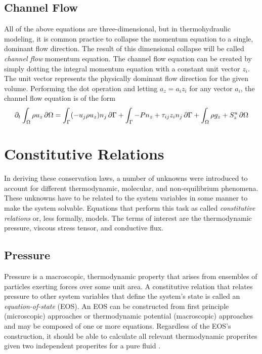 \documentclass[12pt]{../UWMadThesis}
\begin{document}
\subsection{Channel Flow}
All of the above equations are three-dimensional, but in thermohydraulic modeling, it is common practice to collapse the momentum equation to a single, dominant flow direction.
The result of this dimensional collapse will be called \textit{channel flow} momentum equation.
The channel flow equation can be created by simply dotting the integral momentum equation with a constant unit vector $z_i$.
The unit vector represents the physically dominant flow direction for the given volume.
Performing the dot operation and letting $a_z = a_i z_i$ for any vector $a_i$, the channel flow equation is of the form
\begin{equation}
    \partial_t\:\! \int_{\Omega} \rho u_z \,\partial\Omega = \int_{\Gamma} (-u_j \rho u_z) n_j \,\partial\Gamma + \int_{\Gamma} - P n_z + \tau_{ij} z_i n_j \,\partial\Gamma + \int_{\Omega} \rho g_z + S^u_z \,\partial\Omega
\end{equation}








\section{Constitutive Relations}\label{Section:ConstitutiveRelations}
In deriving these conservation laws, a number of unknowns were introduced to account for different thermodynamic, molecular, and non-equilibrium phenomena.
These unknowns have to be related to the system variables in some manner to make the system solvable.
Equations that perform this task as called \textit{constitutive relations} or, less formally, models.
The terms of interest are the thermodynamic pressure, viscous stress tensor, and conductive flux.

\subsection{Pressure}
Pressure is a macroscopic, thermodynamic property that arises from ensembles of particles exerting forces over some unit area.
A constitutive relation that relates pressure to other system variables that define the system's state is called an \textit{equation-of-state} (EOS).
An EOS can be constructed from first principle (microscopic) approaches or thermodynamic potential (macroscopic) approaches and may be composed of one or more equations.
Regardless of the EOS's construction, it should be able to calculate all relevant thermodynamic properites given two independent properites for a pure fluid \NeedReference{}.
\end{document}

